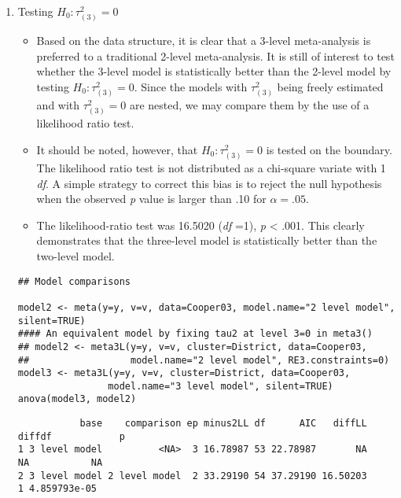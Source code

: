 \documentclass[11pt]{article}
\begin{document}
\begin{enumerate}
\item Testing \(H_0: \tau^2_{(3)} = 0\)
\label{sec:orga82ed6d}
\begin{itemize}
\item Based on the data structure, it is clear that a 3-level meta-analysis is preferred to a traditional 2-level meta-analysis. It is still of interest to test whether the 3-level model is statistically better than the 2-level model by testing \(H_0: \tau^2_{(3)}=0\). Since the models with \(\tau^2_{(3)}\) being freely estimated and with \(\tau^2_{(3)}=0\) are nested, we may compare them by the use of a likelihood ratio test.
\item It should be noted, however, that \(H_0: \tau^2_{(3)}=0\) is tested on the boundary. The likelihood ratio test is not distributed as a chi-square variate with 1 \emph{df}. A simple strategy to correct this bias is to reject the null hypothesis when the observed \emph{p} value is larger than .10 for \(\alpha=.05\).

\item The likelihood-ratio test was 16.5020 (\emph{df} =1), \emph{p} < .001. This clearly demonstrates that the three-level model is statistically better than the two-level model.
\end{itemize}
\begin{verbatim}
## Model comparisons

model2 <- meta(y=y, v=v, data=Cooper03, model.name="2 level model", silent=TRUE) 
#### An equivalent model by fixing tau2 at level 3=0 in meta3()
## model2 <- meta3L(y=y, v=v, cluster=District, data=Cooper03, 
##                  model.name="2 level model", RE3.constraints=0) 
model3 <- meta3L(y=y, v=v, cluster=District, data=Cooper03, 
                model.name="3 level model", silent=TRUE) 
anova(model3, model2)
\end{verbatim}

\begin{verbatim}
           base    comparison ep minus2LL df      AIC   diffLL diffdf            p
1 3 level model          <NA>  3 16.78987 53 22.78987       NA     NA           NA
2 3 level model 2 level model  2 33.29190 54 37.29190 16.50203      1 4.859793e-05
\end{verbatim}


\end{enumerate}
\end{document}
